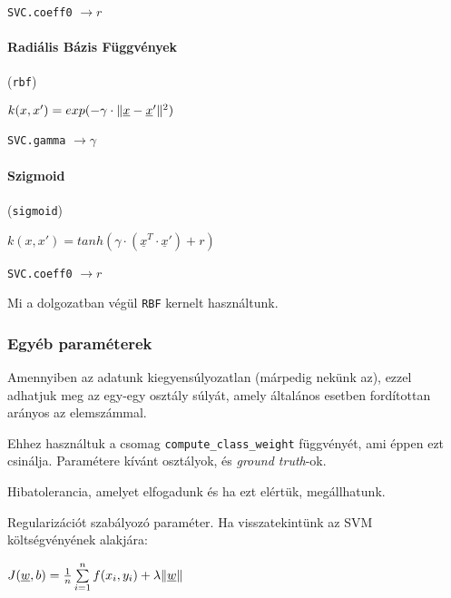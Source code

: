 \texttt{SVC.coeff0} $ \rightarrow r $

\paragraph{Radiális Bázis Függvények} (\texttt{rbf})


$ k(x, x') = exp( - \gamma \cdot \lVert\underline{x} - \underline{x}'\rVert^2) $

\texttt{SVC.gamma} $ \rightarrow \gamma $




\paragraph{Szigmoid} (\texttt{sigmoid})

$ k(x, x') = tanh(\gamma \cdot (\underline{x}^T \cdot \underline{x}') + r) $

\texttt{SVC.coeff0} $ \rightarrow r $


\noindent
Mi a dolgozatban végül \texttt{RBF} kernelt használtunk.

\subsubsection{Egyéb paraméterek}

Amennyiben az adatunk kiegyensúlyozatlan (márpedig nekünk az), ezzel adhatjuk meg
az egy-egy osztály súlyát, amely általános esetben fordítottan arányos az elemszámmal.

Ehhez használtuk a csomag \texttt{compute\_class\_weight} függvényét, ami éppen ezt csinálja.
Paramétere  kívánt osztályok, és \textit{ground truth}-ok.


Hibatolerancia, amelyet elfogadunk és ha ezt elértük, megállhatunk.




Regularizációt\cite{sklearn.regularization} szabályozó paraméter. Ha visszatekintünk az SVM költségvényének alakjára:

$ J(\underline{w},b)  = \frac{1}{n} \sum\limits_{i=1}^{n} 
f(x_i, y_i) + \lambda \lVert\underline{w}\rVert $

